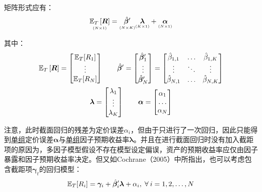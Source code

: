 \documentclass[11pt]{article}
\begin{document}
矩阵形式应有：
\begin{equation*}
    \underset{\scriptscriptstyle{(N \times 1)}}{\mathbb{E}_T\left[\bm{R}\right]}
    = \underset{\scriptscriptstyle{(N \times K)}}{\hat{\bm{\beta}}'}
    \underset{\scriptscriptstyle{(K \times 1)}}{\bm{\lambda}}
    + \underset{\scriptscriptstyle{(N \times 1)}}{\bm{\alpha}}
\end{equation*}

其中：
\begin{gather*}
    \mathbb{E}_T\left[\bm{R}\right] = \begin{bmatrix} \mathbb{E}_T[R_1] \\ \vdots \\ \mathbb{E}_T[R_N] \end{bmatrix}
    \qquad
    \hat{\bm{\beta}}'
    = \begin{bmatrix} \hat{\bm{\beta}}_{1}' \\ \vdots \\ \hat{\bm{\beta}}_{N}' \end{bmatrix}
    = \begin{bmatrix} \hat{\beta}_{1,1} & \dots & \hat{\beta}_{1,K} \\ \vdots & \ddots & \vdots \\ \hat{\beta}_{N,1} & \dots & \hat{\beta}_{N,K} \end{bmatrix}
    \\
    \bm{\lambda} = \begin{bmatrix} \lambda_{1} \\ \vdots \\ \lambda_{K} \end{bmatrix}
    \qquad
    \bm{\alpha} = \begin{bmatrix} \alpha_1 \\ \dots \\ \alpha_N \end{bmatrix}
\end{gather*}

注意，此时截面回归的残差为定价误差$\alpha_i$，但由于只进行了一次回归，因此只能得到\uline{单组}定价误差$\bm{\alpha}$与\uline{单组}因子预期收益率$\bm{\lambda}$。并且在进行截面回归时没有加入截距项的原因为，多因子模型假设不存在模型设定偏误，资产的预期收益率应仅由因子暴露和因子预期收益率决定。但又如Cochrane（2005）中所指出，也可以考虑包含截距项$\bm{\gamma}_t$的回归模型：
\begin{equation*}
    \E_T[R_{i}] = \bm{\gamma}_i + \hat{\bm{\beta}}_{i}' \bm{\lambda} + \alpha_{i} \ilsep \forall i=1,2,\dots,N
\end{equation*}
\end{document}
